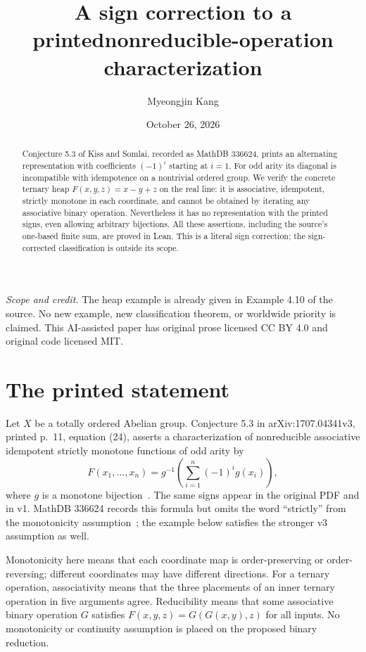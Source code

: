 \documentclass[11pt]{article}
\title{A sign correction to a printed\newline nonreducible-operation characterization}
\author{Myeongjin Kang}
\date{October 26, 2026}
\begin{document}
\maketitle
\begin{abstract}
Conjecture 5.3 of Kiss and Somlai, recorded as MathDB 336624, prints an
alternating representation with coefficients $(-1)^i$ starting at $i=1$.
For odd arity its diagonal is incompatible with idempotence on a nontrivial
ordered group. We verify the concrete ternary heap $F(x,y,z)=x-y+z$ on the
real line: it is associative, idempotent, strictly monotone in each coordinate,
and cannot be obtained by iterating any associative binary operation.
Nevertheless it has no representation with the printed signs, even allowing
arbitrary bijections. All these assertions, including the source's one-based
finite sum, are proved in Lean. This is a literal sign correction; the
sign-corrected classification is outside its scope.
\end{abstract}
\noindent\textit{Scope and credit.} The heap example is already given in
Example 4.10 of the source. No new example, new classification theorem, or
worldwide priority is claimed. This AI-assisted paper has original prose
licensed CC BY 4.0 and original code licensed MIT.

\section{The printed statement}
Let $X$ be a totally ordered Abelian group. Conjecture 5.3 in
arXiv:1707.04341v3, printed p.~11, equation (24), asserts a characterization
of nonreducible associative idempotent strictly monotone functions of odd
arity by
\begin{equation}\label{eq:printed}
 F(x_1,\ldots,x_n)=g^{-1}\left(\sum_{i=1}^n(-1)^i g(x_i)\right),
\end{equation}
where $g$ is a monotone bijection~\cite{KS}. The same signs appear in the
original PDF and in v1. MathDB 336624 records this formula but omits the
word ``strictly'' from the monotonicity assumption~\cite{MathDB}; the
example below satisfies the stronger v3 assumption as well.

Monotonicity here means that each coordinate map is order-preserving or
order-reversing; different coordinates may have different directions.
For a ternary operation, associativity means that the three placements
of an inner ternary operation in five arguments agree. Reducibility means
that some associative binary operation $G$ satisfies
$F(x,y,z)=G(G(x,y),z)$ for all inputs. No monotonicity or continuity
assumption is placed on the proposed binary reduction.
\end{document}
